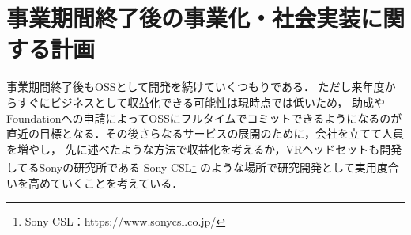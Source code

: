 \section{事業期間終了後の事業化・社会実装に関する計画}

事業期間終了後もOSSとして開発を続けていくつもりである．
ただし来年度からすぐにビジネスとして収益化できる可能性は現時点では低いため，
助成やFoundationへの申請によってOSSにフルタイムでコミットできるようになるのが
直近の目標となる．その後さらなるサービスの展開のために，会社を立てて人員を増やし，
先に述べたような方法で収益化を考えるか，VRヘッドセットも開発してるSonyの研究所である
Sony CSL\footnote{Sony CSL：https://www.sonycsl.co.jp/}
のような場所で研究開発として実用度合いを高めていくことを考えている．


